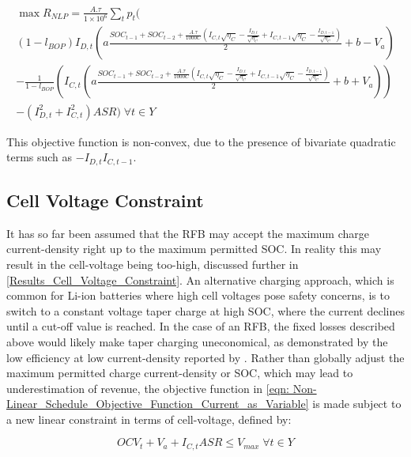 \documentclass[preprint,3p,review,authoryear,10pt]{elsarticle}
\begin{document}
\begin{equation}
    \label{eqn: NLP_true_OCV_long_form}
    \begin{split}
\max R_{NLP} = \frac{A.\tau}{1\times 10^{6}}\sum_{t}p_{t}(\\
(1-l_{BOP})I_{D, t}(a\frac{SOC_{t-1} + SOC_{t-2} + \frac{A.\tau}{1000C}(I_{C,t}\sqrt{\eta_C} - \frac{I_{D,t}}{\sqrt{\eta_C}} +  I_{C,t-1}\sqrt{\eta_C} - \frac{I_{D,t-1}}{\sqrt{\eta_C}})}{2} + b - V_a)\\ - \frac{1}{1-l_{BOP}}(I_{C, t}(a\frac{SOC_{t-1} +  SOC_{t-2} + \frac{A.\tau}{1000C}(I_{C,t}\sqrt{\eta_C} - \frac{I_{D,t}}{\sqrt{\eta_C}} + I_{C,t-1}\sqrt{\eta_C} - \frac{I_{D,t-1}}{\sqrt{\eta_C}})}{2} + b + V_a))\\ 
- (I_{D,t}^{2} + I_{C,t}^{2})ASR) \; \forall t \in Y
\end{split}
\end{equation}


This objective function is non-convex, due to the presence of bivariate quadratic terms such as $-I_{D,t}I_{C,t-1}$. 


\subsection{Cell Voltage Constraint}
\label{Model_Formulation_Constraint_Cell_Voltage}
It has so far been assumed that the RFB may accept the maximum charge current-density right up to the maximum permitted SOC. In reality this may result in the cell-voltage being too-high, discussed further in \cref{Results_Cell_Voltage_Constraint}. An alternative charging approach, which is common for Li-ion batteries where high cell voltages pose safety concerns, is to switch to a constant voltage taper charge at high SOC, where the current declines until a cut-off value is reached. In the case of an RFB, the fixed losses described above would likely make taper charging uneconomical, as demonstrated by the low efficiency at low current-density reported by \cite{Nguyen2014}. Rather than globally adjust the maximum permitted charge current-density or SOC, which may lead to underestimation of revenue, the objective function in \cref{eqn: Non-Linear_Schedule_Objective_Function_Current_as_Variable} is made subject to a new linear constraint in terms of cell-voltage, defined by:
    
    \begin{equation}
\label{eqn: Cell_Voltage_Constraint}
OCV_t + V_a + I_{C,t}ASR \leq V_{max} \; \forall t \in Y
\end{equation}
\end{document}
